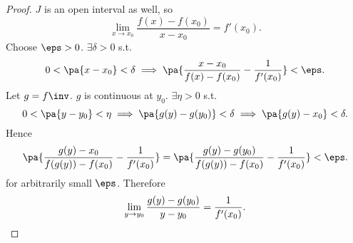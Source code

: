 \documentclass[11pt]{scrartcl}
\numberwithin{equation}{section}
\begin{document}
\begin{proof}
    $J$ is an open interval as well, so 
    \[
        \lim_{x\rightarrow x_0}\frac{f(x)-f(x_0)}{x-x_0}=f'(x_0).
    \]
    Choose $\eps>0$. $\exists \delta >0$ s.t. 
    \[
        0 < \pa{x-x_0} < \delta \implies \pa{\frac{x-x_0}{f(x)-f(x_0)}-\frac{1}{f'(x_0)}} < \eps.
    \]
    Let $g=f\inv$. $g$ is continuous at $y_0$. $\exists \eta > 0$ s.t.
    \[
        0 < \pa{y-y_0} < \eta \implies \pa{g(y)-g(y_0)} < \delta
        \implies \pa{g(y) - x_0} < \delta.
    \]
    Hence 
    \[
        \pa{\frac{g(y)-x_0}{f(g(y)) - f(x_0)} - \frac{1}{f'(x_0)}} = \pa{\frac{g(y)-g(y_0)}{f(g(y)) - f(x_0)} - \frac{1}{f'(x_0)}} < \eps.
    \]
    for arbitrarily small $\eps$. Therefore 
    \[
        \lim_{y\rightarrow y_0}\frac{g(y)-g(y_0)}{y-y_0} = \frac{1}{f'(x_0)}. \qedhere
    \]
\end{proof}
\end{document}
